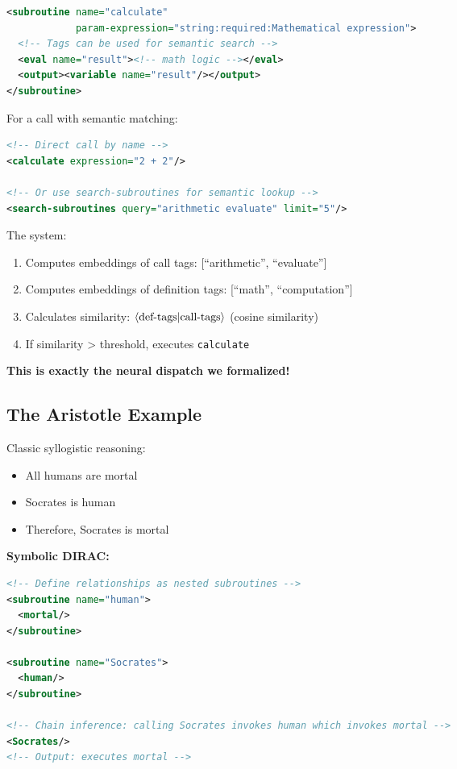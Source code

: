 \documentclass[11pt,a4paper]{article}
\theoremstyle{definition}
\begin{document}
\begin{lstlisting}[language=XML]
<subroutine name="calculate"
            param-expression="string:required:Mathematical expression">
  <!-- Tags can be used for semantic search -->
  <eval name="result"><!-- math logic --></eval>
  <output><variable name="result"/></output>
</subroutine>
\end{lstlisting}

For a call with semantic matching:
\begin{lstlisting}[language=XML]
<!-- Direct call by name -->
<calculate expression="2 + 2"/>

<!-- Or use search-subroutines for semantic lookup -->
<search-subroutines query="arithmetic evaluate" limit="5"/>
\end{lstlisting}

The system:
\begin{enumerate}
\item Computes embeddings of call tags: [``arithmetic'', ``evaluate'']
\item Computes embeddings of definition tags: [``math'', ``computation'']
\item Calculates similarity: $\braket{\text{def-tags}|\text{call-tags}}$ (cosine similarity)
\item If similarity > threshold, executes \texttt{calculate}
\end{enumerate}

\textbf{This is exactly the neural dispatch we formalized!}

\subsection{The Aristotle Example}

Classic syllogistic reasoning:
\begin{itemize}
\item All humans are mortal
\item Socrates is human
\item Therefore, Socrates is mortal
\end{itemize}

\textbf{Symbolic DIRAC:}
\begin{lstlisting}[language=XML]
<!-- Define relationships as nested subroutines -->
<subroutine name="human">
  <mortal/>
</subroutine>

<subroutine name="Socrates">
  <human/>
</subroutine>

<!-- Chain inference: calling Socrates invokes human which invokes mortal -->
<Socrates/>
<!-- Output: executes mortal -->
\end{lstlisting}
\end{document}
